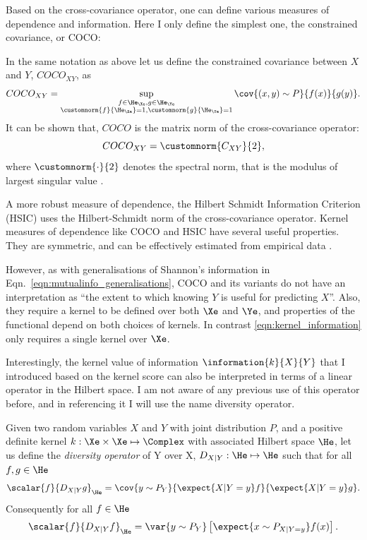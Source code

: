 Based on the cross-covariance operator, one can define various measures of dependence and information. Here I only define the simplest one, the constrained covariance, or COCO:

\begin{definition}
	In the same notation as above let us define the constrained covariance between $X$ and $Y$, $COCO_{XY}$, as
	\begin{equation}
		COCO_{XY}=\sup_{\substack{f\in\He_\Xe, g\in\He_\Ye \\\customnorm{f}{\He_\Xe}=1,\customnorm{g}{\He_\Ye}=1}} \cov{(x,y)\sim P}{f(x)}{g(y)}.
	\end{equation}
	It can be shown that, $COCO$ is the matrix norm of the cross-covariance operator:
	\begin{equation}
		COCO_{XY} = \customnorm{C_{XY}}{2},
	\end{equation}
	where $\customnorm{\cdot}{2}$ denotes the spectral norm, that is the modulus of largest singular value \citep{Gretton2005COCO}.
\end{definition}

A more robust measure of dependence, the Hilbert Schmidt Information Criterion (HSIC) uses the Hilbert-Schmidt norm of the cross-covariance operator\citep{Gretton2005HSIC}. Kernel measures of dependence like COCO and HSIC have several useful properties. They are symmetric, and can be effectively estimated from empirical data \citep{Gretton2005HSIC}.

However, as with generalisations of Shannon's information in Eqn.\ \eqref{eqn:mutualinfo_generalisations}, COCO and its variants do not have an interpretation as ``the extent to which knowing $Y$ is useful for predicting $X$''. Also, they require a kernel to be defined over both $\Xe$ and $\Ye$, and properties of the functional depend on both choices of kernels. In contrast \eqref{eqn:kernel_information} only requires a single kernel over $\Xe$.

Interestingly, the kernel value of information $\information{k}{X}{Y}$ that I introduced based on the kernel score can also be interpreted in terms of a linear operator in the Hilbert space. I am not aware of any previous use of this operator before, and in referencing it I will use the name diversity operator.

\begin{definition}
Given two random variables $X$ and $Y$ with joint distribution $P$, and a positive definite kernel $k:\Xe\times\Xe\mapsto\Complex$ with associated Hilbert space $\He$, let us define the \emph{diversity operator} of Y over X, $D_{X\vert Y}:\He\mapsto\He$ such that for all $f,g\in\He$
%
\begin{align}
	\scalar{f}{D_{X\vert Y}g}_{\He} = \cov{y\sim P_Y}{\expect{X\vert Y=y} f}{\expect{X\vert Y=y} g}.
\end{align}
%
Consequently for all $f\in\He$
%
\begin{align}
	\scalar{f}{D_{X\vert Y}f}_{\He} = \var{y\sim P_Y} \left[ \expect{x\sim P_{X\vert Y=y}} f(x) \right].
\end{align}
\end{definition}

